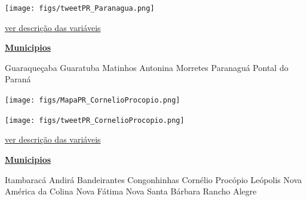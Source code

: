 \documentclass[10pt]{article} %
\begin{document}
\begin{minipage}[t]{.66\linewidth}
\begin{center}
\texttt{[image: figs/tweetPR\_Paranagua.png]}\end{center}
\begin{center}

\end{center}
\small{\hyperlink{vartab}{ver descrição das variáveis}}\end{minipage}\hfill\begin{minipage}[t]{.30\linewidth}
\begin{mdframed}[style=sidebar,frametitle={}]
\textbf{\hyperlink{municips}{Municipios}}\begin{itemize}\gsquare Guaraqueçaba 
\gsquare Guaratuba 
\gsquare Matinhos 
\gsquare Antonina 
\gsquare Morretes 
\gsquare Paranaguá 
\gsquare Pontal do Paraná 
\end{itemize}\BackToContents\end{mdframed}\hfill\end{minipage}\newpage\begin{minipage}[t]{.66\linewidth}
\hypertarget{CrnP}{}
\texttt{[image: figs/MapaPR\_CornelioProcopio.png]}\vspace{0.5cm}\vspace{0.5cm}\begin{center}
\texttt{[image: figs/tweetPR\_CornelioProcopio.png]}\end{center}
\begin{center}

\end{center}
\small{\hyperlink{vartab}{ver descrição das variáveis}}\end{minipage}\hfill\begin{minipage}[t]{.30\linewidth}
\begin{mdframed}[style=sidebar,frametitle={}]
\textbf{\hyperlink{municips}{Municipios}}\begin{itemize}\gsquare Itambaracá 
\gsquare Andirá 
\gsquare Bandeirantes 
\gsquare Congonhinhas 
\gsquare Cornélio Procópio 
\gsquare Leópolis 
\gsquare Nova América da Colina 
\gsquare Nova Fátima 
\gsquare Nova Santa Bárbara 
\gsquare Rancho Alegre 

\end{itemize}
\end{mdframed}
\end{minipage}
\end{document}
